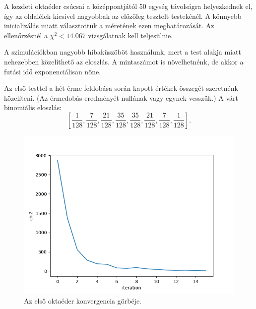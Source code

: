 \newpage


A kezdeti oktaéder csúcsai a középpontjától 50 egység távolságra helyezkednek el, így az oldalélek kicsivel nagyobbak az előzőleg tesztelt testekénél.
A könnyebb inicializálás miatt választottuk a méretének ezen meghatározását.
Az ellenőrzésnél a $\chi^2 < 14.067$ vizsgálatnak kell teljesülnie.

\begin{remark}
A szimulációkban nagyobb hibaküszöböt használunk, mert a test alakja miatt nehezebben közelíthető az eloszlás.
A mintaszámot is növelhetnénk, de akkor a futási idő exponenciálisan nőne.
\end{remark}

Az első testtel a hét érme feldobása során kapott értékek összegét szeretnénk közelíteni.
(Az érmedobás eredményét nullának vagy egynek vesszük.)
A várt binomiális eloszlás: 
\[
[\frac{1}{128}, \frac{7}{128}, \frac{21}{128}, \frac{35}{128}, \frac{35}{128}, \frac{21}{128}, \frac{7}{128}, \frac{1}{128}].
\]

\begin{figure}[h!]
	\centering
	\includegraphics[scale=0.7]{images/octahedron_01.png}
	\caption{Az első oktaéder konvergencia görbéje.}
	\label{fig:octa01}
\end{figure}

